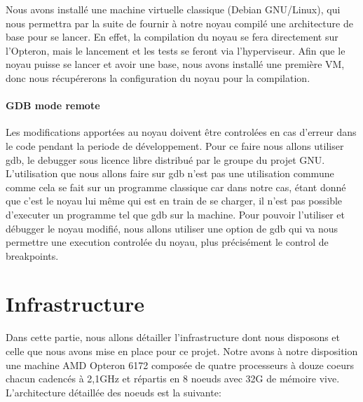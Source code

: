         Nous avons installé une machine virtuelle classique (Debian GNU/Linux), qui
        nous permettra par la suite de fournir à notre noyau compilé une
        architecture de base pour se lancer. En effet, la compilation du noyau se
        fera directement sur l'Opteron, mais le lancement et les tests se feront via
        l'hyperviseur. Afin que le noyau puisse se lancer et avoir une base, nous
        avons installé une première VM, donc nous récupérerons la configuration du
        noyau pour la compilation.

    \paragraph{GDB mode remote}

        Les modifications apportées au noyau doivent être controlées en cas d'erreur 
        dans le code pendant la periode de développement. Pour ce faire nous allons 
        utiliser gdb, le debugger sous licence libre distribué par le groupe du 
        projet GNU. L'utilisation que nous allons faire sur gdb n'est pas une 
        utilisation commune comme cela se fait sur un programme classique car
        dans notre cas, étant donné que c'est le noyau lui même qui est en train de se
        charger, il n'est pas possible d'executer un programme tel que gdb sur la 
        machine. Pour pouvoir l'utiliser et débugger le noyau modifié, nous allons
        utiliser une option de gdb qui va nous permettre une execution controlée
        du noyau, plus précisément le control de breakpoints. \\
  \section{Infrastructure}
    Dans cette partie, nous allons détailler l'infrastructure dont nous
    disposons et celle que nous avons mise en place pour ce projet. Notre avons
    à notre disposition une machine AMD Opteron 6172 composée de quatre
    processeurs à douze coeurs chacun cadencés à 2,1GHz et répartis en 8 noeuds
    avec 32G de mémoire vive. L'architecture détaillée des noeuds est la
    suivante:




